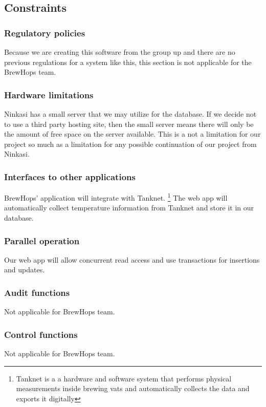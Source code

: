 \documentclass[draftclsnofoot,onecolumn,letterpaper,10pt,compsoc]{IEEEtran}
\begin{document}
	\subsection{Constraints}
		\subsubsection{Regulatory policies}
		Because we are creating this software from the group up and there are no previous regulations for a system like this, this section is not applicable for the BrewHops team.

		\subsubsection{Hardware limitations}
		Ninkasi has a small server that we may utilize for the database.
		If we decide not to use a third party hosting site, then the small server means there will only be the amount of free space on the server available.
		This is a not a limitation for our project so much as a limitation for any possible continuation of our project from Ninkasi.

		\subsubsection{Interfaces to other applications}
		BrewHops’ application will integrate with Tanknet.
		\footnote{Tanknet is a a hardware and software system that performs physical measurements inside brewing vats and automatically collects the data and exports it digitally}
		The web app will automatically collect temperature information from Tanknet and store it in our database.


		\subsubsection{Parallel operation}
        Our web app will allow concurrent read access and use transactions for insertions and updates.

		\subsubsection{Audit functions}
        Not applicable for BrewHops team.

		\subsubsection{Control functions}
        Not applicable for BrewHops team.
\end{document}
